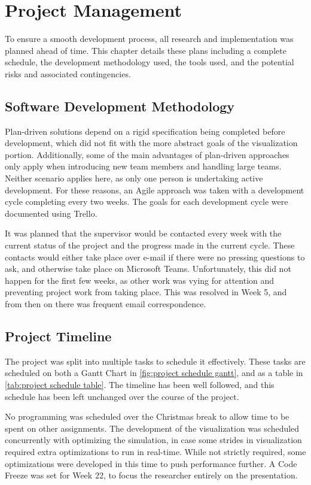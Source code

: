 
\chapter{Project Management}
\label{sec:ProjectManagement}

To ensure a smooth development process, all research and implementation was planned ahead of time.
This chapter details these plans including a complete schedule, the development methodology used, the tools used, and the potential risks and associated contingencies.

\section{Software Development Methodology}
Plan-driven solutions depend on a rigid specification being completed before development\cite{modules:CS261}, which did not fit with the more abstract goals of the visualization portion.
Additionally, some of the main advantages of plan-driven approaches only apply when introducing new team members and handling large teams.
Neither scenario applies here, as only one person is undertaking active development.
For these reasons, an Agile approach was taken with a development cycle completing every two weeks.
The goals for each development cycle were documented using Trello.

It was planned that the supervisor would be contacted every week with the current status of the project and the progress made in the current cycle.
These contacts would either take place over e-mail if there were no pressing questions to ask, and otherwise take place on Microsoft Teams.
Unfortunately, this did not happen for the first few weeks, as other work was vying for attention and preventing project work from taking place.
This was resolved in Week 5, and from then on there was frequent email correspondence.

\section{Project Timeline}
The project was split into multiple tasks to schedule it effectively.
These tasks are scheduled on both a Gantt Chart in \cref{fig:project schedule gantt}, and as a table in \cref{tab:project schedule table}.
The timeline has been well followed, and this schedule has been left unchanged over the course of the project. 

No programming was scheduled over the Christmas break to allow time to be spent on other assignments.
The development of the visualization was scheduled concurrently with optimizing the simulation, in case some strides in visualization required extra optimizations to run in real-time.
While not strictly required, some optimizations were developed in this time to push performance further.
A Code Freeze was set for Week 22, to focus the researcher entirely on the presentation.

